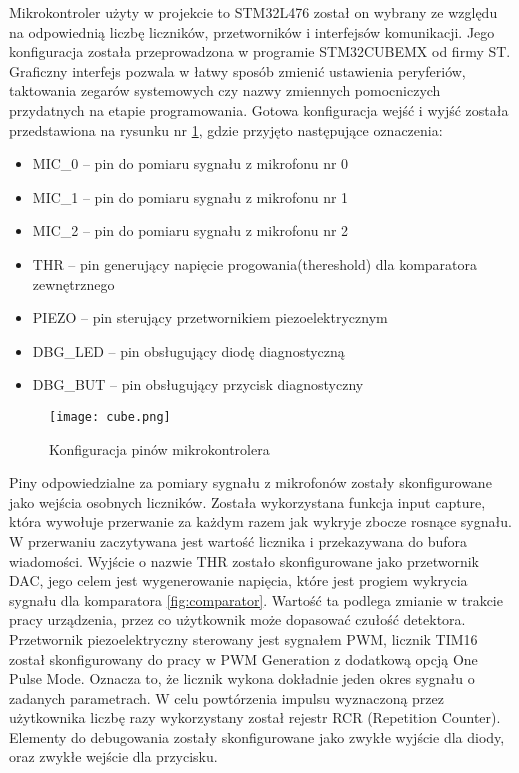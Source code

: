 Mikrokontroler użyty w projekcie to STM32L476 został on wybrany ze względu na odpowiednią liczbę liczników, przetworników i interfejsów komunikacji. 
Jego konfiguracja została przeprowadzona w programie STM32CUBEMX od firmy ST. 
Graficzny interfejs pozwala w łatwy sposób zmienić ustawienia peryferiów, 
taktowania zegarów systemowych czy nazwy zmiennych pomocniczych przydatnych na etapie programowania.
Gotowa konfiguracja wejść i wyjść została przedstawiona na rysunku nr \ref{fig:cube}, gdzie przyjęto następujące oznaczenia:

\begin{itemize}
    \item MIC\_0 -- pin do pomiaru sygnału z mikrofonu nr 0
    \item MIC\_1 -- pin do pomiaru sygnału z mikrofonu nr 1
    \item MIC\_2 -- pin do pomiaru sygnału z mikrofonu nr 2
    \item THR -- pin generujący napięcie progowania(thereshold) dla komparatora zewnętrznego 
    \item PIEZO -- pin sterujący przetwornikiem piezoelektrycznym 
    \item DBG\_LED -- pin obsługujący diodę diagnostyczną
    \item DBG\_BUT -- pin obsługujący przycisk diagnostyczny
\end{itemize}

\begin{figure}[ht!]
    \centering
    \texttt{[image: cube.png]}
    \caption{Konfiguracja pinów mikrokontrolera}
    \label{fig:cube}
\end{figure}

Piny odpowiedzialne za pomiary sygnału z mikrofonów zostały skonfigurowane jako wejścia osobnych liczników. 
Została wykorzystana funkcja input capture, która wywołuje przerwanie za każdym razem jak wykryje zbocze rosnące sygnału. 
W przerwaniu zaczytywana jest wartość licznika i przekazywana do bufora wiadomości.
Wyjście o nazwie THR zostało skonfigurowane jako przetwornik DAC, jego celem jest wygenerowanie napięcia, 
które jest progiem wykrycia sygnału dla komparatora \ref{fig:comparator}. Wartość ta podlega zmianie w trakcie pracy urządzenia, 
przez co użytkownik może dopasować czułość detektora.
Przetwornik piezoelektryczny sterowany jest sygnałem PWM, licznik TIM16 został skonfigurowany do pracy w PWM Generation z dodatkową opcją One Pulse Mode. 
Oznacza to, że licznik wykona dokładnie jeden okres sygnału o zadanych parametrach. 
W celu powtórzenia impulsu wyznaczoną przez użytkownika liczbę razy wykorzystany został rejestr RCR (Repetition Counter).
Elementy do debugowania zostały skonfigurowane jako zwykłe wyjście dla diody, oraz zwykłe wejście dla przycisku.


